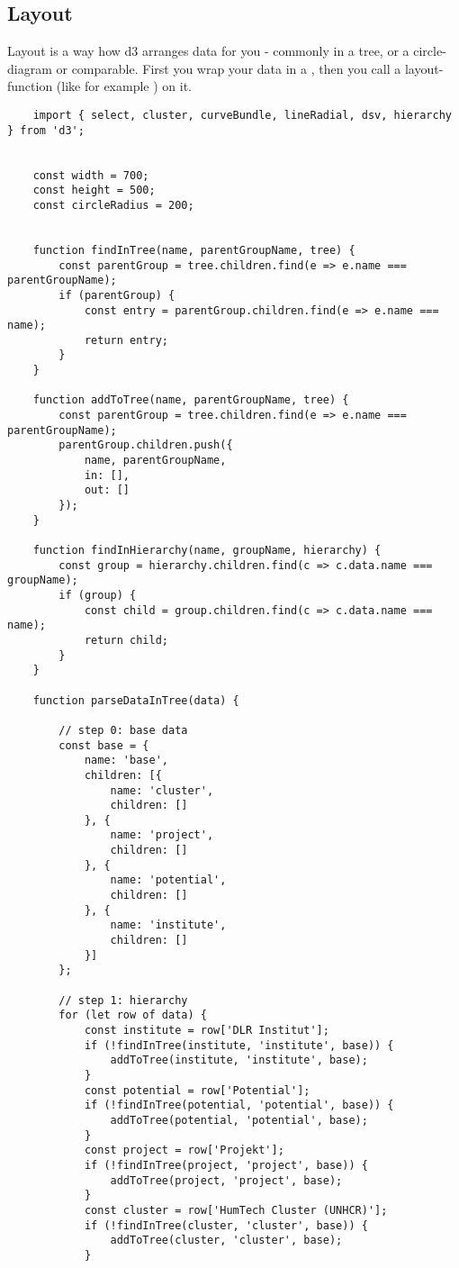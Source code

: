 \subsection{Layout}
Layout is a way how d3 arranges data for you - commonly in a tree, or a circle-diagram or comparable. First you wrap your data in a , then you call a layout-function (like for example ) on it.
\begin{lstlisting}
    import { select, cluster, curveBundle, lineRadial, dsv, hierarchy } from 'd3';


    const width = 700;
    const height = 500;
    const circleRadius = 200;
    
    
    function findInTree(name, parentGroupName, tree) {
        const parentGroup = tree.children.find(e => e.name === parentGroupName);
        if (parentGroup) {
            const entry = parentGroup.children.find(e => e.name === name);
            return entry;
        }
    }
    
    function addToTree(name, parentGroupName, tree) {
        const parentGroup = tree.children.find(e => e.name === parentGroupName);
        parentGroup.children.push({
            name, parentGroupName,
            in: [],
            out: []
        });
    }
    
    function findInHierarchy(name, groupName, hierarchy) {
        const group = hierarchy.children.find(c => c.data.name === groupName);
        if (group) {
            const child = group.children.find(c => c.data.name === name);
            return child;
        }
    }
    
    function parseDataInTree(data) {
    
        // step 0: base data
        const base = {
            name: 'base',
            children: [{
                name: 'cluster',
                children: []
            }, {
                name: 'project',
                children: []
            }, {
                name: 'potential',
                children: []
            }, {
                name: 'institute',
                children: []
            }]
        };
    
        // step 1: hierarchy
        for (let row of data) {
            const institute = row['DLR Institut'];
            if (!findInTree(institute, 'institute', base)) {
                addToTree(institute, 'institute', base);
            }
            const potential = row['Potential'];
            if (!findInTree(potential, 'potential', base)) {
                addToTree(potential, 'potential', base);
            }
            const project = row['Projekt'];
            if (!findInTree(project, 'project', base)) {
                addToTree(project, 'project', base);
            }
            const cluster = row['HumTech Cluster (UNHCR)'];
            if (!findInTree(cluster, 'cluster', base)) {
                addToTree(cluster, 'cluster', base);
            }
    

\end{lstlisting}
